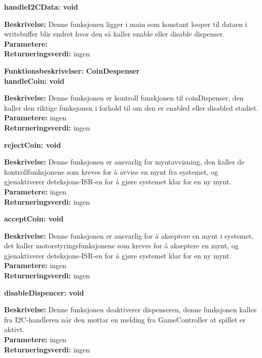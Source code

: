 \documentclass[Arkitektur/System_main.tex]{subfiles}
\begin{document}
\textbf {handleI2CData: void}
\begin{adjustwidth}{1cm}{0pt}
\textbf {Beskrivelse:} Denne funksjonen ligger i main som konstant looper til dataen i writebuffer blir endret hvor den så kaller enable eller disable dispenser.  \\ [0.2cm]
\textbf {Parametere:} \\ [0.2cm]
\textbf {Returneringsverdi:} ingen \\ [0.2cm]
\end{adjustwidth}

{\large\textbf{Funktionsbeskrivelser: CoinDespenser}}\\[0.2cm]

\textbf {handleCoin: void}
\begin{adjustwidth}{1cm}{0pt}
\textbf {Beskrivelse:} Denne funksjonen er kontroll funskjonen til coinDispenser, den kaller den riktige funksjonen i forhold til om den er enabled eller disabled stadiet. \\ [0.2cm]
\textbf {Parametere:} ingen \\ [0.2cm]
\textbf {Returneringsverdi:} ingen \\ [0.2cm]
\end{adjustwidth}


\textbf {rejectCoin: void}
\begin{adjustwidth}{1cm}{0pt}
\textbf {Beskrivelse:} Denne funksjonen er ansvarlig for myntavvisning, den kaller de kontrollfunksjonene som kreves for å avvise en mynt fra systemet, og gjenaktiverer deteksjons-ISR-en for å gjøre systemet klar for en ny mynt. \\ [0.2cm]
\textbf {Parametere:} ingen \\ [0.2cm]
\textbf {Returneringsverdi:} ingen \\ [0.2cm]
\end{adjustwidth}

\textbf {acceptCoin: void}
\begin{adjustwidth}{1cm}{0pt}
\textbf {Beskrivelse:} Denne funksjonen er ansvarlig for å akseptere en mynt i systemet, det kaller motorstyringsfunksjonene som kreves for å akseptere en mynt, og gjenaktiverer deteksjons-ISR-en for å gjøre systemet klar for en ny mynt. \\ [0.2cm]
\textbf {Parametere:} ingen \\ [0.2cm]
\textbf {Returneringsverdi:} ingen \\ [0.2cm]
\end{adjustwidth}

\textbf {disableDispencer: void}
\begin{adjustwidth}{1cm}{0pt}
\textbf {Beskrivelse:} Denne funksjonen deaktiverer dispenseren, denne funksjonen kalles fra I2C-handleren når den mottar en melding fra GameController at spillet er aktivt. \\ [0.2cm]
\textbf {Parametere:} ingen \\ [0.2cm]
\textbf {Returneringsverdi:} ingen \\ [0.2cm]
\end{adjustwidth}
\end{document}
